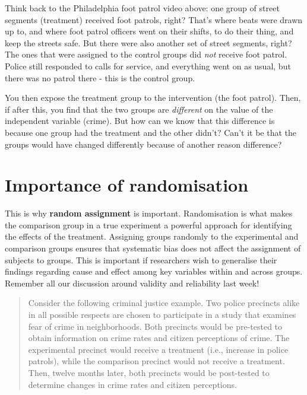 \documentclass[
]{book}
\begin{document}
Think back to the Philadelphia foot patrol video above: one group of street segments (treatment) received foot patrols, right? That's where beats were drawn up to, and where foot patrol officers went on their shifts, to do their thing, and keep the streets safe. But there were also another set of street segments, right? The ones that were assigned to the control groups did \emph{not} receive foot patrol. Police still responded to calls for service, and everything went on as usual, but there was no patrol there - this is the control group.

You then expose the treatment group to the intervention (the foot patrol). Then, if after this, you find that the two groups are \emph{different} on the value of the independent variable (crime). But how can we know that this difference is because one group had the treatment and the other didn't? Can't it be that the groups would have changed differently because of another reason difference?

\hypertarget{importance-of-randomisation}{%
\section{Importance of randomisation}\label{importance-of-randomisation}}

This is why \textbf{random assignment} is important. Randomisation is what makes the comparison group in a true experiment a powerful approach for identifying the effects of the treatment. Assigning groups randomly to the experimental and comparison groups ensures that systematic bias does not affect the assignment of subjects to groups. This is important if researchers wish to generalise their findings regarding cause and effect among key variables within and across groups. Remember all our discussion around validity and reliability last week!

\begin{quote}
Consider the following criminal justice example. Two police precincts alike in all possible respects are chosen to participate in a study that examines fear of crime in neighborhoods. Both precincts would be pre-tested to obtain information on crime rates and citizen perceptions of crime. The experimental precinct would receive a treatment (i.e., increase in police patrols), while the comparison precinct would not receive a treatment. Then, twelve months later, both precincts would be post-tested to determine changes in crime rates and citizen perceptions.
\end{quote}
\end{document}

